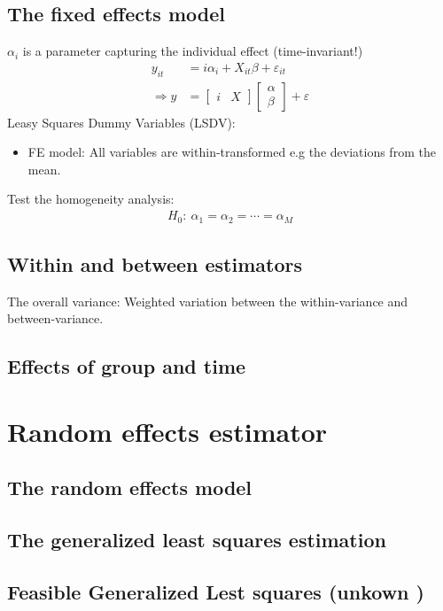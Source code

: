 \begin{multicols}{2}
\subsection{The fixed effects model}
$\alpha_i$ is a parameter capturing the individual effect (time-invariant!)
\begin{align*}
    y_{it}&=i\alpha_i+X_{it}\beta+\varepsilon_{it}\\
    \Rightarrow y &= [\begin{array}{cc}i & X\end{array}] \left[\begin{array}{c}\alpha \\ \beta\end{array}\right] + \varepsilon
\end{align*}
Leasy Squares Dummy Variables (LSDV):
\begin{itemize}
  \item FE model: All variables are within-transformed e.g the deviations from the mean.
\end{itemize}
Test the homogeneity analysis:
\begin{align*}
  H_0:\ \alpha_1=\alpha_2=\cdots=\alpha_M
\end{align*}


\subsection{Within and between estimators}
The overall variance: Weighted variation between the within-variance and between-variance.


\subsection{Effects of group and time}


\end{multicols}

\section{Random effects estimator} %
\begin{multicols}{2}
\subsection{The random effects model}


\subsection{The generalized least squares estimation}


\subsection{Feasible Generalized Lest squares (unkown )}



\end{multicols}


